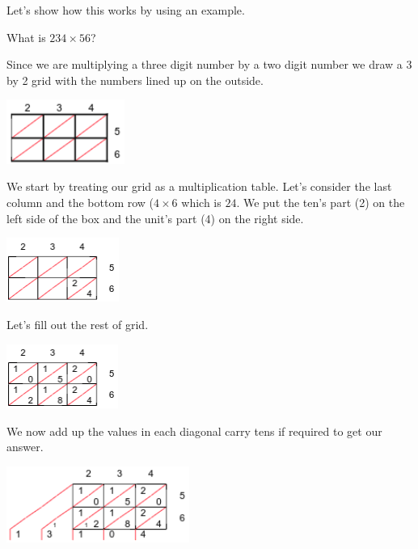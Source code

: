 Let's show how this works by using an example.
\begin{exmp}
	What is $234 \times 56$?

	Since we are multiplying a three digit number by a two digit number we draw a 3 by 2 grid with the numbers lined up on the outside.

	\begin{center}
	\includegraphics[height=2.1cm,keepaspectratio]{./Images/Number/mult1}
	\end{center}

	We start by treating our grid as a multiplication table.  Let's consider the last column and the bottom row ($4 \times 6$ which is $24$.  We put the ten's part (2) on the left side of the box and the unit's part (4) on the right side.

	\begin{center}
	\includegraphics[height=2.1cm,keepaspectratio]{./Images/Number/mult2}
	\end{center}

	Let's fill out the rest of grid.

	\begin{center}
	\includegraphics[height=2.1cm,keepaspectratio]{./Images/Number/mult3}
	\end{center}

	We now add up the values in each diagonal carry tens if required to get our answer.

	\begin{center}
	\includegraphics[height=2.5cm,keepaspectratio]{./Images/Number/mult4}
	\end{center}
\end{exmp}

